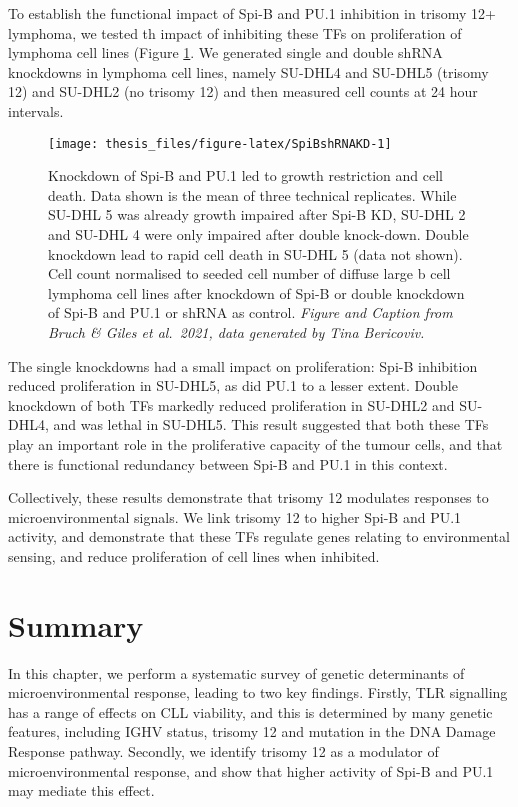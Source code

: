 \documentclass[11pt, a4paper, twosided]{book}
\begin{document}
To establish the functional impact of Spi-B and PU.1 inhibition in trisomy 12+ lymphoma, we tested th impact of inhibiting these TFs on proliferation of lymphoma cell lines (Figure \ref{fig:SpiBshRNAKD}. We generated single and double shRNA knockdowns in lymphoma cell lines, namely SU-DHL4 and SU-DHL5 (trisomy 12) and SU-DHL2 (no trisomy 12) and then measured cell counts at 24 hour intervals.


\begin{figure}

{\centering \texttt{[image: thesis\_files/figure-latex/SpiBshRNAKD-1]} 

}

\caption{Knockdown of Spi-B and PU.1 led to growth restriction and cell death. Data shown is the mean of three technical replicates. While SU-DHL 5 was already growth impaired after Spi-B KD, SU-DHL 2 and SU-DHL 4 were only impaired after double knock-down. Double knockdown lead to rapid cell death in SU-DHL 5 (data not shown). Cell count normalised to seeded cell number of diffuse large b cell lymphoma cell lines after knockdown of Spi-B or double knockdown of Spi-B and PU.1 or shRNA as control. \emph{Figure and Caption from Bruch \& Giles et al.~2021, data generated by Tina Bericoviv.}}\label{fig:SpiBshRNAKD}
\end{figure}
The single knockdowns had a small impact on proliferation: Spi-B inhibition reduced proliferation in SU-DHL5, as did PU.1 to a lesser extent. Double knockdown of both TFs markedly reduced proliferation in SU-DHL2 and SU-DHL4, and was lethal in SU-DHL5. This result suggested that both these TFs play an important role in the proliferative capacity of the tumour cells, and that there is functional redundancy between Spi-B and PU.1 in this context.

Collectively, these results demonstrate that trisomy 12 modulates responses to microenvironmental signals. We link trisomy 12 to higher Spi-B and PU.1 activity, and demonstrate that these TFs regulate genes relating to environmental sensing, and reduce proliferation of cell lines when inhibited.

\hypertarget{summary-1}{%
\section{Summary}\label{summary-1}}

In this chapter, we perform a systematic survey of genetic determinants of microenvironmental response, leading to two key findings. Firstly, TLR signalling has a range of effects on CLL viability, and this is determined by many genetic features, including IGHV status, trisomy 12 and mutation in the DNA Damage Response pathway. Secondly, we identify trisomy 12 as a modulator of microenvironmental response, and show that higher activity of Spi-B and PU.1 may mediate this effect.
\end{document}
